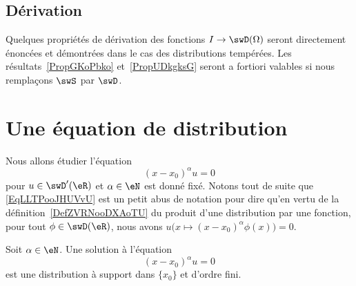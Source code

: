 \subsection{Dérivation}

Quelques propriétés de dérivation des fonctions \( I\to \swD(\Omega)\) seront directement énoncées et démontrées dans le cas des distributions tempérées. Les résultats~\ref{PropGKoPbko} et~\ref{PropUDkgksG} seront a fortiori valables si nous remplaçons \( \swS\) par \( \swD\).

\section{Une équation de distribution}

Nous allons étudier l'équation
\begin{equation}    \label{EqLLTPooJHUVvU}
	(x-x_0)^{\alpha}u=0
\end{equation}
pour \( u\in\swD'(\eR)\) et \( \alpha\in \eN\) est donné fixé. Notons tout de suite que \eqref{EqLLTPooJHUVvU} est un petit abus de notation pour dire qu'en vertu de la définition~\ref{DefZVRNooDXAoTU} du produit d'une distribution par une fonction, pour tout \( \phi\in\swD(\eR)\), nous avons \( u\Big( x\mapsto (x-x_0)^{\alpha}\phi(x) \Big)=0\).

\begin{lemma}       \label{LemWIGKooQpGXoI}
	Soit \( \alpha\in \eN\). Une solution à l'équation
	\begin{equation}        \label{EqKVNEooJNwsPc}
		(x-x_0)^{\alpha}u=0
	\end{equation}
	est une distribution à support dans \( \{ x_0 \}\) et d'ordre fini.
\end{lemma}

